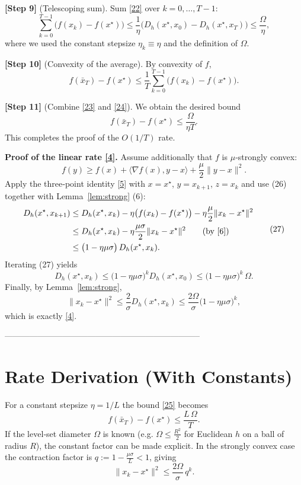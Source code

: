 \documentclass{article}
\newcommand{\inner}[2]{\langle #1,#2\rangle}
\newcommand{\D}[2]{D_{h}(#1,#2)}
\newcommand{\grad}{\nabla}
\begin{document}
\noindent\textbf{[Step 9]} (Telescoping sum).  
Sum \eqref{22} over $k=0,\dots,T-1$:
\[
\sum_{k=0}^{T-1}\big(f(x_k)-f(x^{\star})\big)
\le\frac{1}{\eta}\big(\D{x^{\star}}{x_0}-\D{x^{\star}}{x_T}\big)
\le\frac{\Omega}{\eta}, \tag{23}
\]
where we used the constant stepsize $\eta_k\equiv\eta$ and the definition of $\Omega$.

\noindent\textbf{[Step 10]} (Convexity of the average).  
By convexity of $f$,
\[
f(\bar x_T)-f(x^{\star})\le\frac{1}{T}\sum_{k=0}^{T-1}\big(f(x_k)-f(x^{\star})\big). \tag{24}
\]

\noindent\textbf{[Step 11]} (Combine \eqref{23} and \eqref{24}).  
We obtain the desired bound
\[
f(\bar x_T)-f(x^{\star})\le\frac{\Omega}{\eta T}. \tag{25}
\]
This completes the proof of the $O(1/T)$ rate.

\medskip
\noindent\textbf{Proof of the linear rate \eqref{4}.}  
Assume additionally that $f$ is $\mu$‑strongly convex:
\[
f(y)\ge f(x)+\inner{\grad f(x)}{y-x}+\frac{\mu}{2}\|y-x\|^{2}. \tag{26}
\]
Apply the three‑point identity \eqref{5} with $x=x^{\star}$, $y=x_{k+1}$, $z=x_k$ and use (26) together with Lemma~\ref{lem:strong} (6):
\[
\begin{aligned}
\D{x^{\star}}{x_{k+1}}
&\le \D{x^{\star}}{x_k}-\eta\big(f(x_k)-f(x^{\star})\big)-\eta\frac{\mu}{2}\|x_k-x^{\star}\|^{2}\\
&\le \D{x^{\star}}{x_k}-\eta\frac{\mu\sigma}{2}\|x_k-x^{\star}\|^{2} \qquad\text{(by }\eqref{6}\text{)}\\
&\le \big(1-\eta\mu\sigma\big)\,\D{x^{\star}}{x_k}.
\end{aligned}
\tag{27}
\]
Iterating (27) yields
\[
\D{x^{\star}}{x_{k}}\le\big(1-\eta\mu\sigma\big)^{k}\D{x^{\star}}{x_0}
\le\big(1-\eta\mu\sigma\big)^{k}\,\Omega. \tag{28}
\]
Finally, by Lemma~\ref{lem:strong},
\[
\|x_k-x^{\star}\|^{2}\le\frac{2}{\sigma}\D{x^{\star}}{x_k}
\le\frac{2\Omega}{\sigma}\big(1-\eta\mu\sigma\big)^{k},
\]
which is exactly \eqref{4}. \hfill\qedsymbol

-----------------------------------------------------------------------

\section*{Rate Derivation (With Constants)}
For a constant stepsize $\eta=1/L$ the bound \eqref{25} becomes
\[
f(\bar x_T)-f(x^{\star})\le\frac{L\,\Omega}{T}.
\]
If the level‑set diameter $\Omega$ is known (e.g. $\Omega\le \frac{R^{2}}{2}$ for Euclidean $h$ on a ball of radius $R$), the constant factor can be made explicit.  
In the strongly convex case the contraction factor is $q:=1-\frac{\mu\sigma}{L}<1$, giving
\[
\|x_k-x^{\star}\|^{2}\le\frac{2\Omega}{\sigma}\,q^{k}.
\]
\end{document}
